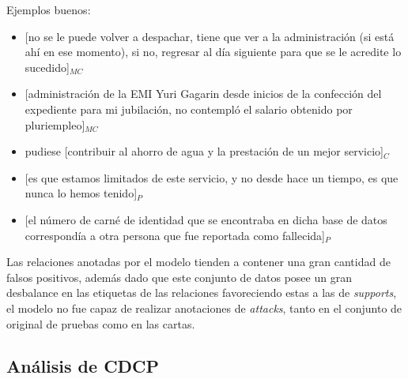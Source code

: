 Ejemplos buenos:
\begin{itemize}
	\item \text{} [no se le puede volver a despachar, tiene que ver a la administración (si está ahí en ese momento), 
	si no, regresar al día siguiente para que se le acredite lo sucedido]$_{MC}$ %
	\item \text{} [administración de la EMI Yuri Gagarin desde inicios de la confección del expediente para 
	mi jubilación, no contempló el salario obtenido por pluriempleo]$_{MC}$ %
	\item pudiese [contribuir al ahorro de agua y la prestación de un mejor servicio]$_C$ %
	\item \text{} [es que estamos limitados de este servicio, y no desde hace un tiempo, es que nunca lo hemos tenido]$_P$ %
	\item \text{} [el número de carné de identidad que se encontraba en dicha base de datos correspondía a otra persona que
	fue reportada como fallecida]$_P$ %
\end{itemize}

Las relaciones anotadas por el modelo tienden a contener una gran cantidad de falsos positivos, además
dado que este conjunto de datos posee un gran desbalance en las etiquetas de las relaciones favoreciendo 
estas a las de \emph{supports}, el modelo no fue capaz de realizar anotaciones de \emph{attacks}, tanto en 
el conjunto de original de pruebas como en las cartas.

\subsection{Análisis de CDCP}


